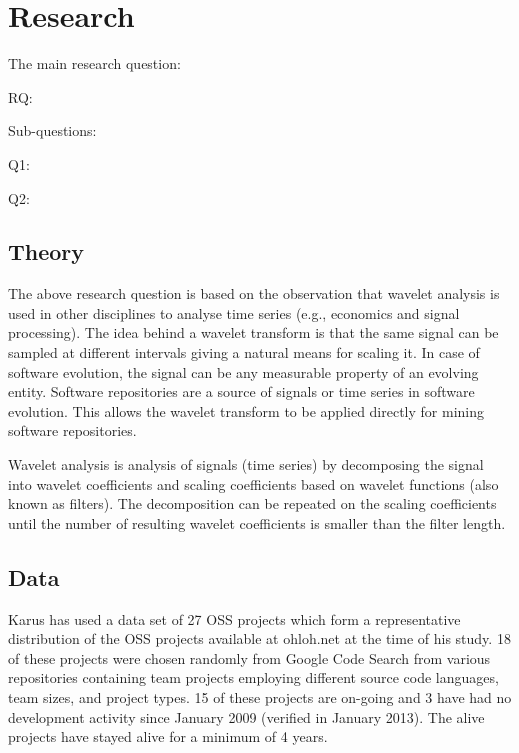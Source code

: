 \section{Research}

The main research question:
\begin{description}
	\item[RQ:] \emph{\researchQuestion}
\end{description}
Sub-questions:
\begin{description}
	\item[Q1:] \emph{\subQuestionOne}
	\item[Q2:] \emph{\subQuestionTwo}
\end{description}

\subsection{Theory}
The above research question is based on the observation that wavelet analysis is
used in other disciplines to analyse time series (e.g., economics and signal
processing). The idea behind a wavelet transform is that the same signal can
be sampled at different intervals giving a natural means for scaling it. In
case of software evolution, the signal can be any measurable property of an
evolving entity. Software repositories are a source of signals or time series
in software evolution. This allows the wavelet transform to be applied directly
for mining software repositories.

Wavelet analysis is analysis of signals (time series) by decomposing the signal
into wavelet coefficients and scaling coefficients based on wavelet functions
(also known as filters). The decomposition can be repeated on the scaling
coefficients until the number of resulting wavelet coefficients is smaller than
the filter length.

\subsection{Data}
Karus has used a data set of 27 OSS projects which form a representative
distribution of the OSS projects available at ohloh.net at the time of his
study. 18 of these projects were chosen randomly from Google Code Search from
various repositories containing team projects employing different source code
languages, team sizes, and project types. 15 of these projects are on-going and
3 have had no development activity since January 2009 (verified in January
2013). The alive projects have stayed alive for a minimum of 4 years.

